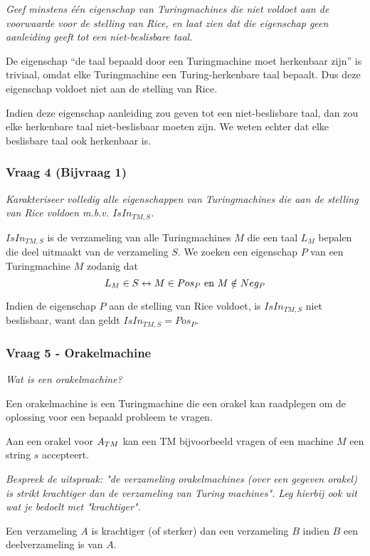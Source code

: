 \textit{Geef minstens \'e\'en eigenschap van Turingmachines die niet voldoet aan de voorwaarde voor de stelling van Rice, en laat zien dat die eigenschap geen aanleiding geeft tot een niet-beslisbare taal.}

De eigenschap ``de taal bepaald door een Turingmachine moet herkenbaar zijn'' is triviaal, omdat elke Turingmachine een Turing-herkenbare taal bepaalt. Dus deze eigenschap voldoet niet aan de stelling van Rice.

Indien deze eigenschap aanleiding zou geven tot een niet-beslisbare taal, dan zou elke herkenbare taal niet-beslisbaar moeten zijn. We weten echter dat elke beslisbare taal ook herkenbaar is.

\subsubsection{Vraag 4 (Bijvraag 1)}

\textit{Karakteriseer volledig alle eigenschappen van Turingmachines die aan de stelling van Rice voldoen m.b.v. $IsIn_{TM,S}$.}

$IsIn_{TM,S}$ is de verzameling van alle Turingmachines $M$ die een taal $L_M$ bepalen die deel uitmaakt van de verzameling $S$. We zoeken een eigenschap $P$ van een Turingmachine $M$ zodanig dat
\begin{equation*}
  L_M \in S \leftrightarrow M \in Pos_P \text{ en } M \notin Neg_P
\end{equation*} 

Indien de eigenschap $P$ aan de stelling van Rice voldoet, is $IsIn_{TM,S}$ niet beslisbaar, want dan geldt $IsIn_{TM,S} = Pos_P$.

\subsubsection{Vraag 5 - Orakelmachine}

\textit{Wat is een orakelmachine?}

Een orakelmachine is een Turingmachine die een orakel kan raadplegen om de oplossing voor een bepaald probleem te vragen.

Aan een orakel voor ${A_{TM}}$ kan een TM bijvoorbeeld vragen of een machine $M$ een string $s$ accepteert.

\textit{Bespreek de uitspraak: "de verzameling orakelmachines (over een gegeven orakel) is strikt krachtiger dan de verzameling van Turing machines". Leg hierbij ook uit wat je bedoelt met "krachtiger".}

Een verzameling $A$ is krachtiger (of sterker) dan een verzameling $B$ indien $B$ een deelverzameling is van $A$.

